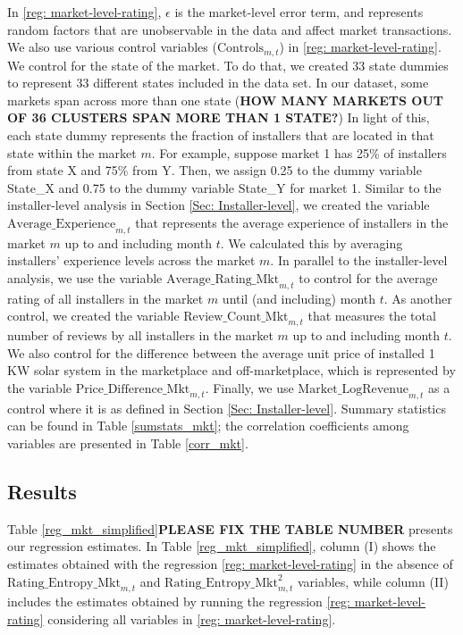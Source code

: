 \documentclass[msom,blindrev]{informs3}
\begin{document}
 In \eqref{reg: market-level-rating}, $\epsilon$ is the market-level error term, and represents random factors that are unobservable in the data and affect market transactions. We also use various control variables ($\text{Controls}_{m,t}$) in \eqref{reg: market-level-rating}. We control for the state of the market. To do that, we created 33 state dummies to represent 33 different states included in the data set. In our dataset, some markets span across more than one state (\textbf{HOW MANY MARKETS OUT OF 36 CLUSTERS SPAN MORE THAN 1 STATE?}) In light of this, each state dummy represents the fraction of installers that are located in that state within the market $m$. For example, suppose market 1 has 25\% of installers from state X and 75\% from Y. Then, we assign 0.25 to the dummy variable State\_X and 0.75 to the dummy variable State\_Y for market 1.  Similar to the installer-level analysis in Section \ref{Sec: Installer-level}, we created the variable $\text{Average\_Experience}_{m,t}$ that represents the average experience of installers in the market $m$ up to and including month $t$. We calculated this by averaging installers' experience levels across the market $m$. In parallel to the installer-level analysis, we use the variable $\text{Average\_Rating\_Mkt}_{m,t}$ to control for the average rating of all installers in the market $m$ until (and including) month $t$. As another control, we created the variable $\text{Review\_Count\_Mkt}_{m,t}$ that measures the total number of reviews by all installers in the market $m$ up to and including month $t$. We also control for the difference between the average unit price of installed 1 KW solar system in the marketplace and off-marketplace, which is represented by the variable $\text{Price\_Difference\_Mkt}_{m,t}$. Finally, we use $\text{Market\_LogRevenue}_{m,t}$ as a control where it is as defined in Section \ref{Sec: Installer-level}. Summary statistics can be found in Table \ref{sumstats_mkt}; the correlation coefficients among variables are presented in Table \ref{corr_mkt}.



\subsection{Results}


Table \ref{reg_mkt_simplified}\textbf{PLEASE FIX THE TABLE NUMBER} presents our regression estimates. In Table \ref{reg_mkt_simplified}, column (I) shows the estimates obtained with the regression \eqref{reg: market-level-rating} in the absence of $\text{Rating\_Entropy\_Mkt}_{m,t}$ and $\text{Rating\_Entropy\_Mkt}^2_{m,t}$ variables, while column (II) includes the estimates obtained by running the regression \eqref{reg: market-level-rating} considering all variables in \eqref{reg: market-level-rating}.



\end{document}
